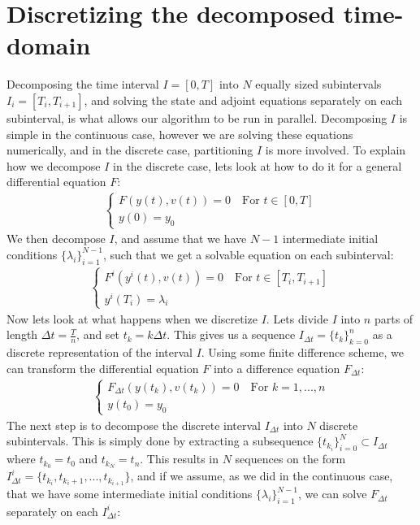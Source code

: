\section{Discretizing the decomposed time-domain}
Decomposing the time interval $I=[0,T]$ into $N$ equally sized subintervals $I_i=[T_i,T_{i+1}]$, and solving the state and adjoint equations separately on each subinterval, is what allows our algorithm to be run in parallel. Decomposing $I$ is simple in the continuous case, however we are solving these equations numerically, and in the discrete case, partitioning $I$ is more involved. To explain how we decompose $I$ in the discrete case, lets look at how to do it for a general differential equation $F$:
\begin{align*}
\left\{
     \begin{array}{lr}
		F(y(t),v(t))=0 \quad	\textrm{For $t \in [0,T]$} \\
		y(0)=y_0
	\end{array}
   \right.	
\end{align*} 
We then decompose $I$, and assume that we have $N-1$ intermediate initial conditions $\{\lambda_i\}_{i=1}^{N-1}$, such that we get a solvable equation on each subinterval:
\begin{align*}
\left\{
     \begin{array}{lr}
		F^i(y^i(t),v(t))=0 \quad \textrm{For $t \in [T_i,T_{i+1}]$} \\
		y^i(T_i)=\lambda_i
	\end{array}
   \right.	
\end{align*} 
Now lets look at what happens when we discretize $I$. Lets divide $I$ into $n$ parts of length $\Delta t=\frac{T}{n}$, and set $t_k=k\Delta t$. This gives us a sequence $I_{\Delta t}=\{t_k\}_{k=0}^{n}$ as a discrete representation of the interval $I$. Using some finite difference scheme, we can transform the differential equation $F$ into a difference equation $F_{\Delta t}$:
    \begin{align*}
\left\{
     \begin{array}{lr}
		F_{\Delta t}(y(t_k),v(t_k))=0 \quad	\textrm{For $k=1,...,n$} \\
		y(t_0)=y_0
	\end{array}
   \right.	
\end{align*} 
The next step is to decompose the discrete interval $I_{\Delta t}$ into $N$ discrete subintervals. This is simply done by extracting a subsequence $\{t_{k_i}\}_{i=0}^N\subset I_{\Delta t}$ where $t_{k_0}=t_0$ and $t_{k_N}=t_n$. This results in $N$ sequences on the form $I_{\Delta t}^i=\{t_{k_i},t_{k_i+1},...,t_{k_{i+1}}\}$, and if we assume, as we did in the continuous case, that we have some intermediate initial conditions $\{\lambda_i\}_{i=1}^{N-1}$, we can solve $F_{\Delta t}$ separately on each $I_{\Delta t}^i$: 
